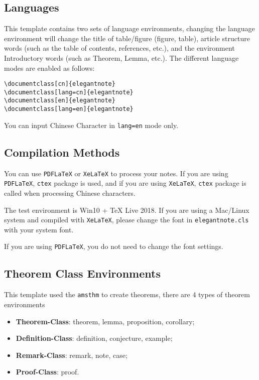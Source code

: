 \documentclass[geye,green,pad,en]{elegantnote}
\begin{document}
\subsection{Languages}
This template contains two sets of language environments, changing the language environment will change the title of table/figure (figure, table), article structure words (such as the table of contents, references, etc.), and the environment Introductory words (such as Theorem, Lemma, etc.). The different language modes are enabled as follows:
\begin{lstlisting}[frame=none]  
\documentclass[cn]{elegantnote}
\documentclass[lang=cn]{elegantnote}
\documentclass[en]{elegantnote}
\documentclass[lang=en]{elegantnote}
\end{lstlisting}
\begin{note}
You can input Chinese Character in \lstinline{lang=en} mode only.
\end{note}

\subsection{Compilation Methods}

You can use \lstinline{PDFLaTeX} or \lstinline{XeLaTeX} to process your notes. If you are using \lstinline{PDFLaTeX}, \lstinline{ctex} package is used, and if you are using \lstinline{XeLaTeX}, \lstinline{ctex} package is called when processing Chinese characters. 

The test environment is Win10 + \TeX{} Live 2018. If you are using a Mac/Linux system and compiled with \lstinline{XeLaTeX},  please change the font in \lstinline{elegantnote.cls} with your system font.

\begin{note}
If you are using \lstinline{PDFLaTeX}, you do not need to change the font settings.
\end{note}

\subsection{Theorem Class Environments}
This template used the \lstinline{amsthm} to create theorems, there are 4 types of theorem environments
\begin{itemize}
\item \textbf{Theorem-Class}: theorem, lemma, proposition, corollary;
\item \textbf{Definition-Class}: definition, conjecture, example;
\item \textbf{Remark-Class}: remark, note, case;
\item \textbf{Proof-Class}: proof.
\end{itemize}
\end{document}
